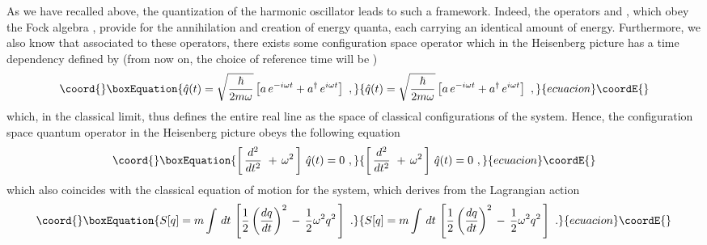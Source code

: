 \documentclass[a4paper,11pt]{article}
\def\one{1\hskip -.37em 1}
\begin{document}
As we have recalled above, the quantization of the harmonic oscillator
leads to such a framework. Indeed, the operators \coordHE{} and \coordHE{},
which obey the Fock algebra \myHighlight{$[a,a^\dagger]=\one$}\coordHE{},
provide for the annihilation and creation of energy quanta, each
carrying an identical amount \myHighlight{$\hbar\omega$}\coordHE{} of energy. Furthermore,
we also know that associated to these operators, there exists some
configuration space operator \coordHE{} which in the Heisenberg picture
has a time dependency defined by (from now on, the choice of
reference time will be \coordHE{})
\begin{equation}\coord{}\boxEquation{
\hat{q}(t)=\sqrt{\frac{\hbar}{2m\omega}}\left[a\,e^{-i\omega t}+
a^\dagger\,e^{i\omega t}\right]\ ,
\label{eq:HOsuperposition}
}{
\hat{q}(t)=\sqrt{\frac{\hbar}{2m\omega}}\left[a\,e^{-i\omega t}+
a^\dagger\,e^{i\omega t}\right]\ ,
}{ecuacion}\coordE{}\end{equation}
which, in the classical limit, thus defines the entire real line
as the space of classical configurations of
the system. Hence, the configuration space quantum operator \coordHE{}
in the Heisenberg picture obeys the following equation
\begin{equation}\coord{}\boxEquation{
\left[\,\frac{d^2}{dt^2}\ +\,\omega^2\,\right]\,\hat{q}(t)=0\ ,
}{
\left[\,\frac{d^2}{dt^2}\ +\,\omega^2\,\right]\,\hat{q}(t)=0\ ,
}{ecuacion}\coordE{}\end{equation}
which also coincides with the classical equation of motion for the
system, which derives from the Lagrangian action
\begin{equation}\coord{}\boxEquation{
S[q]=m\int\,dt\,\left[\frac{1}{2}\left(\frac{dq}{dt}\right)^2\,-\,
\frac{1}{2}\omega^2q^2\,\right]\ .
}{
S[q]=m\int\,dt\,\left[\frac{1}{2}\left(\frac{dq}{dt}\right)^2\,-\,
\frac{1}{2}\omega^2q^2\,\right]\ .
}{ecuacion}\coordE{}\end{equation}
\end{document}
